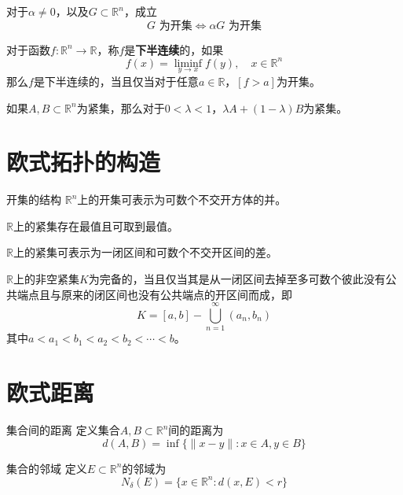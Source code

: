 \documentclass[lang = cn, scheme = chinese, thmcnt = section]{elegantbook}
\newcommand{\R}{\mathbb{R}}            %
\newcommand{\sub}{\subset}             %
\begin{document}
\begin{exercise}
	对于$\alpha\ne0$，以及$G\sub\R^n$，成立%
	$$
	G\text{ 为开集}\iff 
	\alpha G\text{ 为开集}
	$$
\end{exercise}

\begin{exercise}
	对于函数$f:\R^n\to \R$，称$f$是\textbf{下半连续}的，如果
	$$
	f(x)=\liminf_{y\to x}f(y),\quad x\in\R^n
	$$
	那么$f$是下半连续的，当且仅当对于任意$a\in\R$，$[f>a]$为开集。
\end{exercise}

\begin{exercise}
	如果$A,B\sub\R^n$为紧集，那么对于$0<\lambda<1$，$\lambda A+(1-\lambda)B$为紧集。
\end{exercise}

\section{欧式拓扑的构造}

\begin{theorem}{开集的结构}
	$\R^n$上的开集可表示为可数个不交开方体的并。
\end{theorem}

\begin{theorem}
	$\R$上的紧集存在最值且可取到最值。
\end{theorem}

\begin{theorem}
	$\R$上的紧集可表示为一闭区间和可数个不交开区间的差。
\end{theorem}

\begin{theorem}
	$\R$上的非空紧集$K$为完备的，当且仅当其是从一闭区间去掉至多可数个彼此没有公共端点且与原来的闭区间也没有公共端点的开区间而成，即
	$$
	K=[a,b]-\bigcup_{n=1}^{\infty}{(a_n,b_n)}
	$$
	其中$a<a_1<b_1<a_2<b_2<\cdots<b$。
\end{theorem}

\section{欧式距离}

\begin{definition}{集合间的距离}
	定义集合$A,B\sub\R^n$间的距离为
	$$
	d(A,B)=\inf\{ \|x-y\|:x\in A,y\in B \}
	$$
\end{definition}

\begin{definition}{集合的邻域}
	定义$E\sub\R^n$的邻域为%
	$$
	N_\delta(E)=\{ x\in\R^n:d(x,E)<r \}
	$$
\end{definition}
\end{document}
